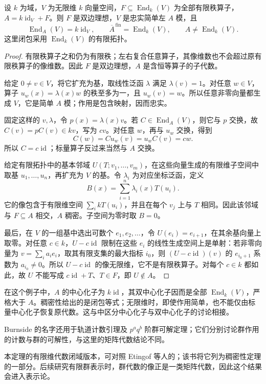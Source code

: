 \begin{proposition}\label{b2:prop:finite-rank-density-counterexample}
	设 \(k\) 为域，\(V\) 为无限维 \(k\) 向量空间，\(F\subseteq\operatorname{End}_k(V)\) 为全部有限秩算子，\(A=k\operatorname{id}_V+F\)。则 \(F\) 是双边理想，\(V\) 是忠实简单左 \(A\) 模，且
	\[
		\operatorname{End}_A(V)=k\operatorname{id}_V, \qquad \overline A^{\,\mathrm{fin}}=\operatorname{End}_k(V), \qquad A\ne\operatorname{End}_k(V).
	\]
	这里闭包采用 \(\operatorname{End}_k(V)\) 的有限拓扑。
\end{proposition}
\begin{proof}
	有限秩算子之和仍为有限秩；左右复合任意算子，其像维数也不会超过原有限秩算子的像维数。因此 \(F\) 是双边理想，\(A\) 是含恒等算子的子代数。

	给定 \(0\ne v\in V\)，将它扩充为基，取线性泛函 \(\lambda\) 满足 \(\lambda(v)=1\)。对任意 \(w\in V\)，算子 \(u_w(x)=\lambda(x)w\) 的秩至多为一，且 \(u_w(v)=w\)。所以任意非零向量都生成 \(V\)，它是简单 \(A\) 模；作用是包含映射，因而忠实。

	固定这样的 \(v,\lambda\)，令 \(p(x)=\lambda(x)v\)。若 \(C\in\operatorname{End}_A(V)\)，则它与 \(p\) 交换，故 \(C(v)=pC(v)\in kv\)，写为 \(cv\)。对任意 \(w\)，再与 \(u_w\) 交换，得到
	\[
		C(w)=Cu_w(v)=u_wC(v)=cw.
	\]
	所以 \(C=c\operatorname{id}\)；标量算子反过来当然与 \(A\) 交换。

	给定有限拓扑中的基本邻域 \(U(T;v_1,\ldots,v_m)\)，在这些向量生成的有限维子空间中取基 \(u_1,\ldots,u_n\)，再扩充为 \(V\) 的基。令 \(\lambda_i\) 为对应坐标泛函，定义
	\[
		B(x)=\sum_{i=1}^n\lambda_i(x)T(u_i).
	\]
	它的像包含于有限维空间 \(\sum_i kT(u_i)\)，并且在每个 \(v_j\) 上与 \(T\) 相同。因此该邻域与 \(F\subseteq A\) 相交，\(A\) 稠密。子空间为零时取 \(B=0\)。

	最后，在 \(V\) 的一组基中选出可数个 \(e_1,e_2,\ldots\)，令 \(U(e_i)=e_{i+1}\)，在其余基向量上取零。对任意 \(c\in k\)，\(U-c\operatorname{id}\) 限制在这些 \(e_i\) 的线性生成空间上是单射：若非零向量为 \(v=\sum_i a_ie_i\)，取其有限支集的最大指标 \(i_0\)，则 \((U-c\operatorname{id})(v)\) 的 \(e_{i_0+1}\) 系数为 \(a_{i_0}\ne0\)。所以 \(U-c\operatorname{id}\) 的像无限维，它不是有限秩算子。对每个 \(c\in k\) 都如此，故 \(U\) 不能写成 \(c\operatorname{id}+T\)、\(T\in F\)，即 \(U\notin A\)。
\end{proof}

在这个例子中，\(A\) 的中心化子为 \(k\operatorname{id}\)，其双中心化子因而是全部 \(\operatorname{End}_k(V)\)，严格大于 \(A\)。稠密性给出的是闭包等式；无限维时，即使作用简单，也不能仅由标量中心化子恢复原代数。这与中区分中心化子与双中心化子的讨论相接。

\ProseParagraphBreak

Burnside 的名字还用于轨道计数引理及 \(p^a q^b\) 阶群可解定理；它们分别讨论群作用的计数与群的可解性，与这里的矩阵代数结论不同。

\ProseParagraphBreak
本定理的有限维代数闭域版本，可对照 Etingof 等人的\cite[Section 3.2, Corollary 3.2.1, Theorem 3.2.2(i), p. 43]{EtingofEtAl2011RepresentationTheory}；该书将它列为稠密性定理的一部分。后续研究有限群表示时，群代数的像正是一类矩阵代数，因此这个结果会进入表示论。
